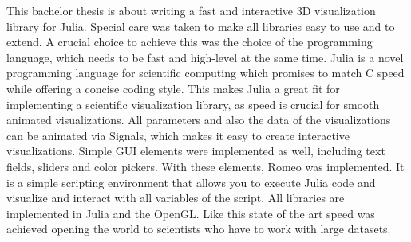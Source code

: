 This bachelor thesis is about writing a fast and interactive 3D visualization library for Julia.
Special care was taken to make all libraries easy to use and to extend.
A crucial choice to achieve this was the choice of the programming language, which needs to be fast and high-level at the same time.
Julia is a novel programming language for scientific computing which promises to match C speed while offering a concise coding style. 
This makes Julia a great fit for implementing a scientific visualization library, as speed is crucial for smooth animated visualizations.
All parameters and also the data of the visualizations can be animated via Signals, which makes it easy to create interactive visualizations.
Simple \ac{GUI} elements were implemented as well, including text fields, sliders and color pickers. 
With these elements, Romeo was implemented. It is a simple scripting environment that allows you to execute Julia code and visualize and interact with all variables of the script.
All libraries are implemented in Julia and the \ac{OpenGL}. 
Like this state of the art speed was achieved opening the world to scientists who have to work with large datasets.

